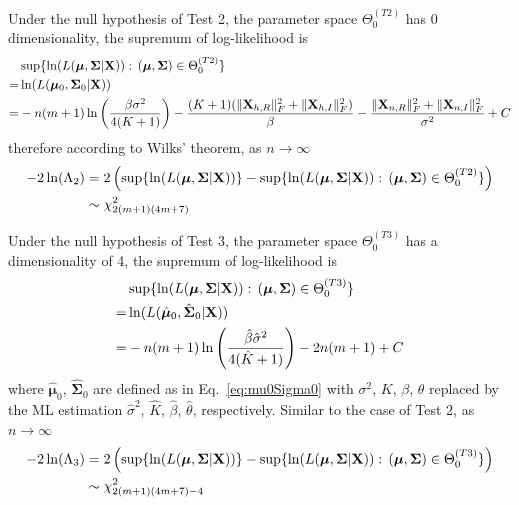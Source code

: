 \documentclass[journal,draftcls,onecolumn,12pt,twoside]{IEEEtran}
\begin{document}
Under the null hypothesis of Test 2, the parameter space $\Theta_0^{(T2)}$ has 0
dimensionality, the supremum of log-likelihood is
\begin{align}
  & \sup \{\ln(L(\bm{\mu}, \mathbf{\Sigma}|\mathbf{X})):\,(\bm{\mu},
  \mathbf{\Sigma})\in \Theta_0^{(T2)}\} \notag \\
  = & \ln(L(\bm{\mu}_0,
  \mathbf{\Sigma}_0|\mathbf{X})) \notag \\
  = & -n(m+1)
  \ln\left(\frac{\beta \sigma^2}{4(K+1)}\right) -
  \frac{(K+1)(\|\mathbf{X}_{h,R}\|_F^2 + \|\mathbf{X}_{h,I}\|_F^2)}{\beta} -
  \frac{\|\mathbf{X}_{n,R}\|_F^2 + \|\mathbf{X}_{n,I}\|_F^2}{\sigma^2}
  + C
\end{align}
therefore according to Wilks' theorem, as $n\rightarrow\infty$ 
\begin{align}
  -2\ln(\Lambda_2) &= 2\left(\sup \{\ln(L(\bm{\mu},
  \mathbf{\Sigma}|\mathbf{X}))\} - \sup \{\ln(L(\bm{\mu}, \mathbf{\Sigma}|\mathbf{X})):\,(\bm{\mu},
  \mathbf{\Sigma})\in \Theta_0^{(T2)}\}\right) \notag \\
  &\sim \chi_{2(m+1)(4m+7)}^2
\end{align}

Under the null hypothesis of Test 3, the parameter space $\Theta_0^{(T3)}$
has a dimensionality of 4, the supremum of log-likelihood is
\begin{align}
  & \sup \{\ln(L(\bm{\mu}, \mathbf{\Sigma}|\mathbf{X})):\,(\bm{\mu},
  \mathbf{\Sigma})\in \Theta_0^{(T3)}\} \notag \\
  = & \ln(L(\hat{\bm{\mu}}_0,
  \hat{\mathbf{\Sigma}}_0|\mathbf{X})) \notag \\
  = & -n(m+1)\ln\left(\frac{\hat{\beta} \hat{\sigma}^2} {4(\hat{K}+1)}\right) -
    2n(m+1) + C
\end{align}
where $\hat{\bm{\mu}}_0 $, $\hat{\mathbf{\Sigma}}_0 $ are defined as in
Eq.~\eqref{eq:mu0Sigma0} with $\sigma^2$, $K$, $\beta$, $\theta$ replaced by
the ML estimation $\hat{\sigma}^2$, $\hat{K}$,
$\hat{\beta}$, $\hat{\theta}$, respectively. Similar to the case of Test 2,
as $n\rightarrow\infty$
\begin{align}
  -2\ln(\Lambda_3) &= 2\left(\sup \{\ln(L(\bm{\mu},
  \mathbf{\Sigma}|\mathbf{X}))\} - \sup \{\ln(L(\bm{\mu}, \mathbf{\Sigma}|\mathbf{X})):\,(\bm{\mu},
  \mathbf{\Sigma})\in \Theta_0^{(T3)}\}\right) \notag \\
  &\sim \chi_{2(m+1)(4m+7) - 4}^2
\end{align}




\end{document}
